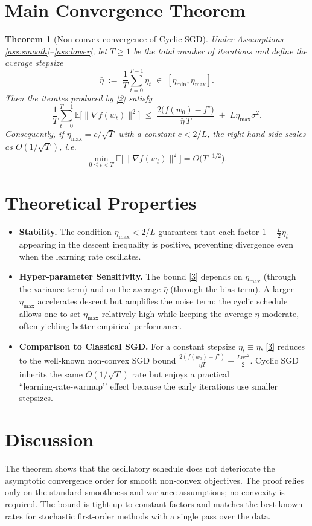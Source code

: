\documentclass{article}
\newtheorem{theorem}{Theorem}
\newcommand{\E}{\mathbb{E}}
\begin{document}
\section*{Main Convergence Theorem}
\begin{theorem}[Non‑convex convergence of Cyclic SGD]\label{thm:main}
Under Assumptions \ref{ass:smooth}–\ref{ass:lower}, let $T\ge1$ be the total
number of iterations and define the average stepsize
\[
\bar\eta \;:=\; \frac{1}{T}\sum_{t=0}^{T-1}\eta_t
\;\in\;[\eta_{\min},\eta_{\max}].
\]
Then the iterates produced by \eqref{2} satisfy
\[
\frac{1}{T}\sum_{t=0}^{T-1}\E\!\big[\|\nabla f(w_t)\|^{2}\big]
\;\le\;
\frac{2\big(f(w_0)-f^\star\big)}{\bar\eta\,T}
\;+\;
L\eta_{\max}\sigma^{2}.
\tag{3}
\]
Consequently, if $\eta_{\max}=c/\sqrt{T}$ with a constant $c<2/L$, the
right‑hand side scales as $O(1/\sqrt{T})$, i.e.
\[
\min_{0\le t<T}\E\!\big[\|\nabla f(w_t)\|^{2}\big]
=O\!\big(T^{-1/2}\big).
\]
\end{theorem}

\section*{Theoretical Properties}
\begin{itemize}[leftmargin=*]
\item \textbf{Stability.}
The condition $\eta_{\max}<2/L$ guarantees that each factor
$1-\tfrac{L}{2}\eta_t$ appearing in the descent inequality is positive,
preventing divergence even when the learning rate oscillates.
\item \textbf{Hyper‑parameter Sensitivity.}
The bound \eqref{3} depends on $\eta_{\max}$ (through the variance term)
and on the average $\bar\eta$ (through the bias term).  A larger
$\eta_{\max}$ accelerates descent but amplifies the noise term; the cyclic
schedule allows one to set $\eta_{\max}$ relatively high while keeping the
average $\bar\eta$ moderate, often yielding better empirical performance.
\item \textbf{Comparison to Classical SGD.}
For a constant stepsize $\eta_t\equiv\eta$, \eqref{3} reduces to the well‑known
non‑convex SGD bound
$\frac{2(f(w_0)-f^\star)}{\eta T}+ \tfrac{L\eta\sigma^2}{2}$.
Cyclic SGD inherits the same $O(1/\sqrt{T})$ rate but enjoys a
practical “learning‑rate‑warmup’’ effect because the early iterations use
smaller stepsizes.
\end{itemize}

\section*{Discussion}
The theorem shows that the oscillatory schedule does not deteriorate the
asymptotic convergence order for smooth non‑convex objectives.  The proof
relies only on the standard smoothness and variance assumptions; no convexity
is required.  The bound is tight up to constant factors and matches the best
known rates for stochastic first‑order methods with a single pass over the
data.
\end{document}

